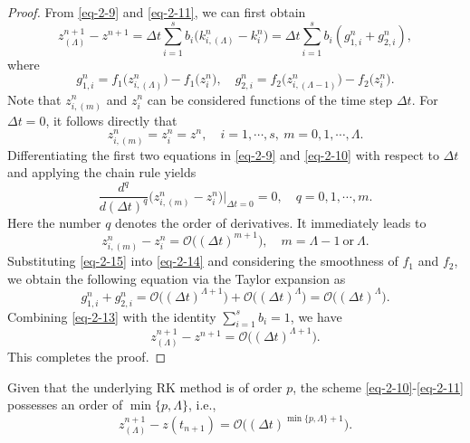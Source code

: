 \documentclass[onefignum,onetabnum]{siamart}
\begin{document}
\begin{proof}
From \eqref{eq-2-9} and \eqref{eq-2-11}, we can first obtain
\begin{equation}\label{eq-2-13}
	z_{(\Lambda)}^{n+1}-z^{n+1}=\Delta t\sum_{i=1}^sb_i\big(k_{i,(\Lambda)}^n-k_i^n)=\Delta t\sum_{i=1}^sb_i(g_{1,i}^n+g_{2,i}^n),
\end{equation}
where 
\begin{equation}\label{eq-2-14}
	g_{1,i}^n=f_1\big(z_{i,(\Lambda)}^n)-f_1(z_i^n\big),\quad g_{2,i}^n=f_2\big(z_{i,(\Lambda-1)}^n\big)-f_2\big(z_i^n\big).
\end{equation}
Note that $z_{i,(m)}^n$ and $z_i^n$ can be considered functions of the time step $\Delta t$. For $\Delta t = 0$, it follows directly that
\begin{equation*}
	z_{i,(m)}^n=z_i^n=z^n,\quad i=1,\cdots,s,~m=0,1,\cdots,\Lambda.
\end{equation*}
Differentiating the first two equations in \eqref{eq-2-9} and \eqref{eq-2-10} with respect to $\Delta t$ and applying the chain rule yields
\begin{equation*}
	\frac{d^{q}}{d(\Delta t)^{q}}\big(z_{i,(m)}^n-z_i^n\big)\bigg|_{\Delta t=0}=0,\quad q=0,1,\cdots,m.
\end{equation*}
Here the number $q$ denotes the order of derivatives. It immediately leads to 
\begin{equation}\label{eq-2-15}
	z_{i,(m)}^n-z_i^n=\mathcal{O}\big((\Delta t)^{m+1}\big),\quad m=\Lambda-1~\mbox{or}~\Lambda.
\end{equation}
Substituting \eqref{eq-2-15} into \eqref{eq-2-14} and considering the smoothness of $f_1$ and $f_2$, we obtain the following equation via the Taylor expansion as
\begin{equation*}
	g_{1,i}^n+g_{2,i}^n=\mathcal{O}\big((\Delta t)^{\Lambda+1}\big)+\mathcal{O}\big((\Delta t)^\Lambda\big)=\mathcal{O}\big((\Delta t)^\Lambda\big).
\end{equation*}
Combining \eqref{eq-2-13} with the identity $\sum_{i=1}^sb_i=1$, we have
\begin{equation*}
	z_{(\Lambda)}^{n+1}-z^{n+1}=\mathcal{O}\big((\Delta t)^{\Lambda+1}\big).
\end{equation*}
This completes the proof.
\end{proof}

\begin{theorem}\label{Th-2-4}
Given that the underlying RK method is of order $p$, the scheme \eqref{eq-2-10}-\eqref{eq-2-11} possesses an order of $\min\{p,\Lambda\}$, i.e.,
\begin{equation}\label{eq-2-16}
	z_{(\Lambda)}^{n+1}-z(t_{n+1})=\mathcal{O}\big((\Delta t)^{\min\{p,\Lambda\}+1}\big).
\end{equation}
\end{theorem}
\end{document}
